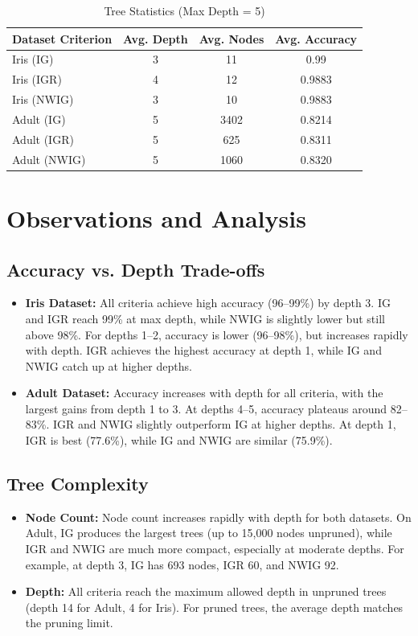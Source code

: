 \documentclass{article}
\begin{document}
\begin{table}[H]
\centering
\caption{Tree Statistics (Max Depth = 5)}
\begin{tabular}{lccc}
\toprule
\multicolumn{1}{l}{\textbf{Dataset \newline Criterion}} & \textbf{Avg. Depth} & \textbf{Avg. Nodes} & \textbf{Avg. Accuracy} \\
\midrule
Iris (IG) & 3 & 11 & 0.99 \\
Iris (IGR) & 4 & 12 & 0.9883 \\
Iris (NWIG) & 3 & 10 & 0.9883 \\
\midrule
Adult (IG) & 5 & 3402 & 0.8214 \\
Adult (IGR) & 5 & 625 & 0.8311 \\
Adult (NWIG) & 5 & 1060 & 0.8320 \\
\bottomrule
\end{tabular}
\label{tab:depth5}
\end{table}

\section*{Observations and Analysis}

\subsection*{Accuracy vs. Depth Trade-offs}
\begin{itemize}
    \item \textbf{Iris Dataset:} All criteria achieve high accuracy (96--99\%) by depth 3. IG and IGR reach 99\% at max depth, while NWIG is slightly lower but still above 98\%. For depths 1--2, accuracy is lower (96--98\%), but increases rapidly with depth. IGR achieves the highest accuracy at depth 1, while IG and NWIG catch up at higher depths.
    \item \textbf{Adult Dataset:} Accuracy increases with depth for all criteria, with the largest gains from depth 1 to 3. At depths 4--5, accuracy plateaus around 82--83\%. IGR and NWIG slightly outperform IG at higher depths. At depth 1, IGR is best (77.6\%), while IG and NWIG are similar (75.9\%).
\end{itemize}

\subsection*{Tree Complexity}
\begin{itemize}
    \item \textbf{Node Count:} Node count increases rapidly with depth for both datasets. On Adult, IG produces the largest trees (up to 15,000 nodes unpruned), while IGR and NWIG are much more compact, especially at moderate depths. For example, at depth 3, IG has 693 nodes, IGR 60, and NWIG 92.
    \item \textbf{Depth:} All criteria reach the maximum allowed depth in unpruned trees (depth 14 for Adult, 4 for Iris). For pruned trees, the average depth matches the pruning limit.
\end{itemize}
\end{document}
